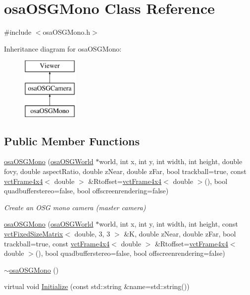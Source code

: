 \hypertarget{classosa_o_s_g_mono}{}\section{osa\+O\+S\+G\+Mono Class Reference}
\label{classosa_o_s_g_mono}


{\ttfamily \#include $<$osa\+O\+S\+G\+Mono.\+h$>$}

Inheritance diagram for osa\+O\+S\+G\+Mono\+:\begin{figure}[H]
\begin{center}
\leavevmode
\includegraphics[height=3.000000cm]{da/dca/classosa_o_s_g_mono}
\end{center}
\end{figure}
\subsection*{Public Member Functions}
\begin{DoxyCompactItemize}
\item 
\hyperlink{classosa_o_s_g_mono_a9abcbd6f0a354b35b4f6be1a85a5e74d}{osa\+O\+S\+G\+Mono} (\hyperlink{classosa_o_s_g_world}{osa\+O\+S\+G\+World} $\ast$world, int x, int y, int width, int height, double fovy, double aspect\+Ratio, double z\+Near, double z\+Far, bool trackball=true, const \hyperlink{classvct_frame4x4}{vct\+Frame4x4}$<$ double $>$ \&Rtoffset=\hyperlink{classvct_frame4x4}{vct\+Frame4x4}$<$ double $>$(), bool quadbufferstereo=false, bool offscreenrendering=false)
\begin{DoxyCompactList}\small\item\em Create an O\+S\+G mono camera (master camera) \end{DoxyCompactList}\item 
\hyperlink{classosa_o_s_g_mono_aa43c6c373c9ba980dd2e587bdab6159a}{osa\+O\+S\+G\+Mono} (\hyperlink{classosa_o_s_g_world}{osa\+O\+S\+G\+World} $\ast$world, int x, int y, int width, int height, const \hyperlink{classvct_fixed_size_matrix}{vct\+Fixed\+Size\+Matrix}$<$ double, 3, 3 $>$ \&K, double z\+Near, double z\+Far, bool trackball=true, const \hyperlink{classvct_frame4x4}{vct\+Frame4x4}$<$ double $>$ \&Rtoffset=\hyperlink{classvct_frame4x4}{vct\+Frame4x4}$<$ double $>$(), bool quadbufferstereo=false, bool offscreenrendering=false)
\item 
\hyperlink{classosa_o_s_g_mono_a2dc8118fe2fdc4820ad496f8950dc230}{$\sim$osa\+O\+S\+G\+Mono} ()
\item 
virtual void \hyperlink{classosa_o_s_g_mono_aa8c16ff1dd8334526053d6c61ef24d03}{Initialize} (const std\+::string \&name=std\+::string())
\end{DoxyCompactItemize}
